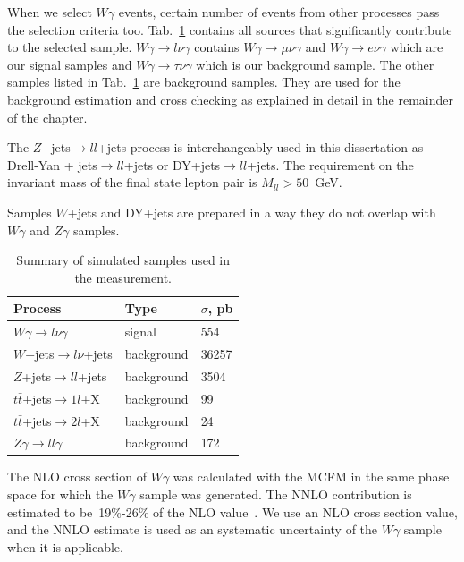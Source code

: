 When we select $W\gamma$ events, certain number of events from other processes pass the selection criteria too. Tab.~\ref{tab:mc_bkg_samples} contains all sources that significantly contribute to the selected sample. $W\gamma \rightarrow l\nu\gamma$ contains $W\gamma \rightarrow \mu\nu\gamma$ and $W\gamma \rightarrow e\nu\gamma$ which are our signal samples and $W\gamma \rightarrow \tau\nu\gamma$ which is our background sample. The other samples listed in Tab.~\ref{tab:mc_bkg_samples} are background samples. They are used for the background estimation and cross checking as explained in detail in the remainder of the chapter.

The $Z$+jets$ \rightarrow ll $+jets process is interchangeably used in this dissertation as Drell-Yan + jets$ \rightarrow ll $+jets or DY+jets$ \rightarrow ll $+jets. The requirement on the invariant mass of the final state lepton pair is $M_{ll}>50$~GeV. 

Samples $W$+jets and DY+jets are prepared in a way they do not overlap with $W\gamma$ and $Z\gamma$ samples.

\begin{table}[h]
  \small
  \begin{center}
    \caption{Summary of simulated samples used in the measurement.}
    \begin{tabular}{|l|l|l|}
      \hline
      Process                              & Type & $\sigma$, pb  \\ \hline
      $W\gamma \rightarrow l\nu\gamma$     & signal & 554   \\ \hline %
      $W$+jets$ \rightarrow l\nu $+jets   & background & 36257  \\ \hline %
      $Z$+jets$ \rightarrow ll $+jets     & background & 3504  \\ \hline %
      $t\bar{t}$+jets$\rightarrow 1l$+X    & background & 99    \\ \hline %
      $t\bar{t}$+jets$\rightarrow 2l$+X    & background & 24    \\ \hline
      $Z\gamma \rightarrow ll\gamma$       & background & 172   \\ \hline
    \end{tabular}
    \label{tab:mc_bkg_samples}
  \end{center}
\end{table} 

The NLO cross section of $W\gamma$ was calculated with the MCFM in the same phase space for which the $W\gamma$ sample was generated. The NNLO contribution is estimated to be~19\%-26\% of the NLO value~\cite{ref_theory_NNLO}. We use an NLO cross section value, and the NNLO estimate is used as an systematic uncertainty of the $W\gamma$ sample when it is applicable. 

